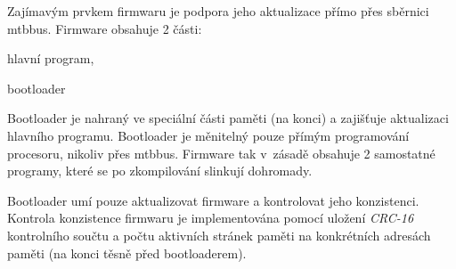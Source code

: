 Zajímavým prvkem firmwaru je podpora jeho aktualizace přímo přes sběrnici
\gls{mtbbus}. Firmware obsahuje 2 části:

\begin{compactenum}
\item hlavní program,
\item bootloader
\end{compactenum}

Bootloader je nahraný ve speciální části paměti (na konci) a zajišťuje
aktualizaci hlavního programu. Bootloader je měnitelný pouze přímým
programování procesoru, nikoliv přes \gls{mtbbus}. Firmware tak v~zásadě
obsahuje 2 samostatné programy, které se po zkompilování slinkují dohromady.

Bootloader umí pouze aktualizovat firmware a kontrolovat jeho konzistenci.
Kontrola konzistence firmwaru je implementována pomocí uložení \textit{CRC-16}
kontrolního součtu a počtu aktivních stránek paměti na konkrétních adresách
paměti (na konci těsně před bootloaderem).
